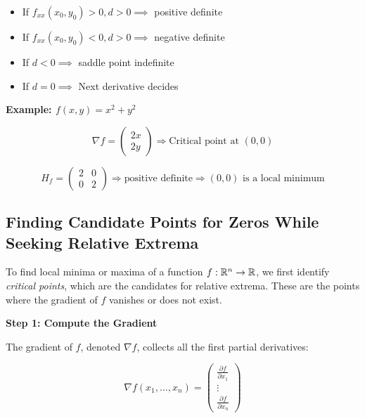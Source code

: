 \begin{itemize}

    \item If \(f_{xx}(x_0, y_0) > 0, d > 0 \implies\) positive definite

    \item If \(f_{xx}(x_0, y_0) < 0, d > 0 \implies\) negative definite

    \item If \(d < 0 \implies \) saddle point indefinite

    \item If \(d = 0 \implies \) Next derivative decides

\end{itemize}

\textbf{Example: \( f(x, y) = x^2 + y^2 \)}

\[
    \nabla f = \begin{pmatrix} 2x \\ 2y \end{pmatrix} \Rightarrow \text{Critical point at } (0, 0)
\]

\[
    H_f = \begin{pmatrix} 2 & 0 \\ 0 & 2 \end{pmatrix} \Rightarrow \text{positive definite}
    \Rightarrow (0, 0) \text{ is a local minimum}
\]

\subsection{Finding Candidate Points for Zeros While Seeking Relative Extrema}

To find local minima or maxima of a function \( f : \mathbb{R}^n \to \mathbb{R} \), we first identify 
\emph{critical points}, which are the candidates for relative extrema. 
These are the points where the gradient of \( f \) vanishes or does not exist.
\vspace{\baselineskip}

\textbf{Step 1: Compute the Gradient}

The gradient of \( f \), denoted \( \nabla f \), collects all the first partial derivatives:

\[
    \nabla f(x_1, \dots, x_n) =
    \begin{pmatrix}
    \frac{\partial f}{\partial x_1} \\
    \vdots \\
    \frac{\partial f}{\partial x_n}
    \end{pmatrix}
\]

